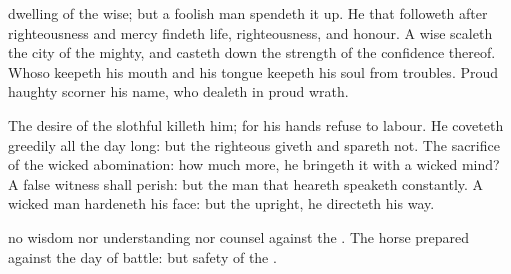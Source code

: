 {dwelling of the
wise; but a
foolish
man spendeth it
up.
He that
followeth after
righteousness and
mercy
findeth
life,
righteousness, and
honour.
A
wise
{}
scaleth the
city of the
mighty, and casteth
down the
strength of the
confidence thereof.
Whoso
keepeth his
mouth and his
tongue
keepeth his
soul from
troubles.
Proud
{}
haughty
scorner
{} his
name, who
dealeth in
proud
wrath.
\par }{\PP {}The
desire of the
slothful
killeth him; for his
hands
refuse to
labour.
He
coveteth
greedily all the
day long: but the
righteous
giveth and
spareth not.
The
sacrifice of the
wicked
{}
abomination: how much more,
{} he
bringeth it with a wicked
mind?
A
false
witness shall
perish: but the
man that
heareth
speaketh
constantly.
A
wicked
man
hardeneth his
face: but
{} the
upright, he
directeth his
way.
\par }{\PP {} no
wisdom nor
understanding nor
counsel against the
{}.
The
horse
{}
prepared against the
day of
battle: but
safety
{} of the
{}.

}
